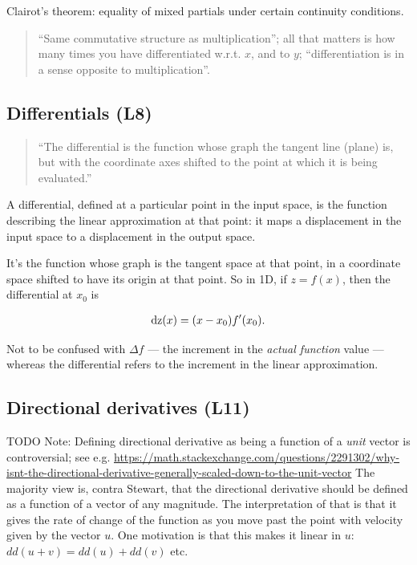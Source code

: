 Clairot's theorem: equality of mixed partials under certain continuity
conditions.

\begin{quote}
``Same commutative structure as multiplication''; all that matters
is how many times you have differentiated w.r.t. $x$, and to $y$;
``differentiation is in a sense opposite to multiplication''.
\end{quote}

\subsection{Differentials (L8)}

\begin{quote}
  ``The differential is the function whose graph the tangent line (plane) is,
  but with the coordinate axes shifted to the point at which it is being
  evaluated.''
\end{quote}

A differential, defined at a particular point in the input space, is the
function describing the linear approximation at that point: it maps a
displacement in the input space to a displacement in the output space.

It's the function whose graph is the tangent space at that point, in a
coordinate space shifted to have its origin at that point. So in 1D, if
$z = f(x)$, then the differential at $x_0$ is

\begin{align*}
  \operatorname{\text{dz}}(x) = (x - x_0)f'(x_0).
\end{align*}


Not to be confused with $\Delta f$ --- the increment in the \textit{actual
  function} value --- whereas the differential refers to the increment in the
linear approximation.


\subsection{Directional derivatives (L11)}

TODO Note: Defining directional derivative as being a function of a \textit{unit} vector is
controversial; see
e.g. \url{https://math.stackexchange.com/questions/2291302/why-isnt-the-directional-derivative-generally-scaled-down-to-the-unit-vector}
The majority view is, contra Stewart, that the directional derivative should be defined as a
function of a vector of any magnitude. The interpretation of that is that it gives the rate of
change of the function as you move past the point with velocity given by the vector $u$. One
motivation is that this makes it linear in $u$: $dd(u + v) = dd(u) + dd(v)$ etc.

